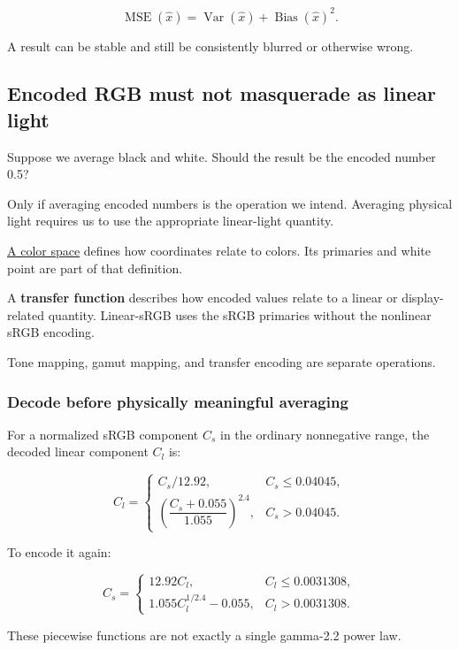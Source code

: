 \[
\operatorname{MSE}(\hat x)
=\operatorname{Var}(\hat x)+\operatorname{Bias}(\hat x)^2.
\]

A result can be stable and still be consistently blurred or otherwise wrong.

\subsection{Encoded RGB must not masquerade as linear light}\label{04-visual-computing-ii-ch043-encoded-rgb-must-not-masquerade-as-linear-light}

Suppose we average black and white. Should the result be the encoded number 0.5?

Only if averaging encoded numbers is the operation we intend. Averaging physical light requires us to use the appropriate linear-light quantity.

\hyperref[appendix-a9f83ad40792]{A color space} defines how coordinates relate to colors. Its primaries and white point are part of that definition.

A \textbf{transfer function} describes how encoded values relate to a linear or display-related quantity. Linear-sRGB uses the sRGB primaries without the nonlinear sRGB encoding.

Tone mapping, gamut mapping, and transfer encoding are separate operations.

\subsubsection{Decode before physically meaningful averaging}\label{04-visual-computing-ii-ch043-decode-before-physically-meaningful-averaging}

For a normalized sRGB component \(C_s\) in the ordinary nonnegative range, the decoded linear component \(C_l\) is:

\[
C_l=
\begin{cases}
C_s/12.92,&C_s\leq0.04045,\\
\left(\dfrac{C_s+0.055}{1.055}\right)^{2.4},
&C_s>0.04045.
\end{cases}
\]

To encode it again:

\[
C_s=
\begin{cases}
12.92C_l,&C_l\leq0.0031308,\\
1.055C_l^{1/2.4}-0.055,&C_l>0.0031308.
\end{cases}
\]

These piecewise functions are not exactly a single gamma-2.2 power law.

